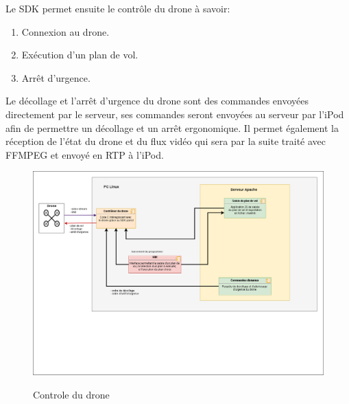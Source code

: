 \documentclass{article}
\begin{document}
	 Le SDK permet ensuite le contrôle du drone à savoir:
	 \begin{enumerate}
        	\item Connexion au drone.
        	\item Exécution d'un plan de vol.
			\item Arrêt d'urgence.
    \end{enumerate}
    Le décollage et l'arrêt d'urgence du drone sont des commandes envoyées directement par le serveur, ses commandes seront envoyées au serveur par l'iPod afin de permettre un décollage et un arrêt ergonomique.
    \vspace{0.2cm}
    \newline
    Il permet également la réception de l'état du drone et du flux vidéo qui sera par la suite traité avec FFMPEG et envoyé en RTP à l'iPod.
    
	    \vspace*{0.3cm}
	    \begin{center}
		\begin{figure}[!h]
		\includegraphics[scale=0.4]{02_archi_logicielle_controle_drone.png}\\
		\caption{Controle du drone}
		\end{figure}
        \end{center}
		
     \newpage
\end{document}
